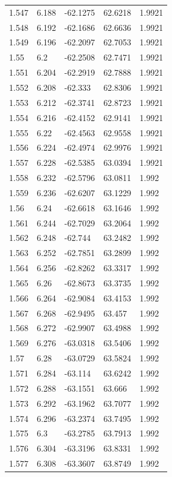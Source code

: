 \begin{tabular}{lllll}
1.547 & 6.188 & -62.1275 & 62.6218 & 1.9921 \\
1.548 & 6.192 & -62.1686 & 62.6636 & 1.9921 \\
1.549 & 6.196 & -62.2097 & 62.7053 & 1.9921 \\
1.55 & 6.2 & -62.2508 & 62.7471 & 1.9921 \\
1.551 & 6.204 & -62.2919 & 62.7888 & 1.9921 \\
1.552 & 6.208 & -62.333 & 62.8306 & 1.9921 \\
1.553 & 6.212 & -62.3741 & 62.8723 & 1.9921 \\
1.554 & 6.216 & -62.4152 & 62.9141 & 1.9921 \\
1.555 & 6.22 & -62.4563 & 62.9558 & 1.9921 \\
1.556 & 6.224 & -62.4974 & 62.9976 & 1.9921 \\
1.557 & 6.228 & -62.5385 & 63.0394 & 1.9921 \\
1.558 & 6.232 & -62.5796 & 63.0811 & 1.992 \\
1.559 & 6.236 & -62.6207 & 63.1229 & 1.992 \\
1.56 & 6.24 & -62.6618 & 63.1646 & 1.992 \\
1.561 & 6.244 & -62.7029 & 63.2064 & 1.992 \\
1.562 & 6.248 & -62.744 & 63.2482 & 1.992 \\
1.563 & 6.252 & -62.7851 & 63.2899 & 1.992 \\
1.564 & 6.256 & -62.8262 & 63.3317 & 1.992 \\
1.565 & 6.26 & -62.8673 & 63.3735 & 1.992 \\
1.566 & 6.264 & -62.9084 & 63.4153 & 1.992 \\
1.567 & 6.268 & -62.9495 & 63.457 & 1.992 \\
1.568 & 6.272 & -62.9907 & 63.4988 & 1.992 \\
1.569 & 6.276 & -63.0318 & 63.5406 & 1.992 \\
1.57 & 6.28 & -63.0729 & 63.5824 & 1.992 \\
1.571 & 6.284 & -63.114 & 63.6242 & 1.992 \\
1.572 & 6.288 & -63.1551 & 63.666 & 1.992 \\
1.573 & 6.292 & -63.1962 & 63.7077 & 1.992 \\
1.574 & 6.296 & -63.2374 & 63.7495 & 1.992 \\
1.575 & 6.3 & -63.2785 & 63.7913 & 1.992 \\
1.576 & 6.304 & -63.3196 & 63.8331 & 1.992 \\
1.577 & 6.308 & -63.3607 & 63.8749 & 1.992 \\

\end{tabular}
